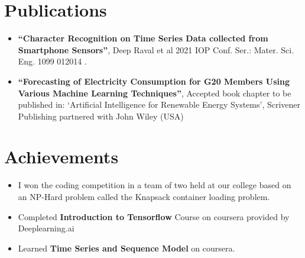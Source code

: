 \documentclass[letterpaper,11pt]{article}
\newcommand{\resumeSubHeadingListStart}{\begin{itemize}[leftmargin=*]}
\newcommand{\resumeSubHeadingListEnd}{\end{itemize}}
\begin{document}
\section{Publications}
\resumeSubHeadingListStart
\item {\bf“Character Recognition on Time Series Data collected from Smartphone Sensors”}, Deep Raval et
al 2021 IOP Conf. Ser.: Mater. Sci. Eng. 1099 012014 .\href{https://iopscience.iop.org/article/10.1088/1757-899X/1099/1/012014}{\faExternalLink}
\item {\bf “Forecasting of Electricity Consumption for G20 Members Using Various Machine Learning
Techniques”}, Accepted book chapter to be published in: ‘Artificial Intelligence for Renewable Energy
Systems’, Scrivener Publishing partnered with John Wiley (USA)
\resumeSubHeadingListEnd

\section{Achievements}
\resumeSubHeadingListStart
\item I won the coding competition in a team of two held at our college based on an NP-Hard problem called the Knapsack container loading problem.
\item Completed {\bf Introduction to Tensorflow} Course on coursera provided by Deeplearning.ai
\item Learned {\bf Time Series and Sequence Model} on coursera.
\resumeSubHeadingListEnd
\end{document}
